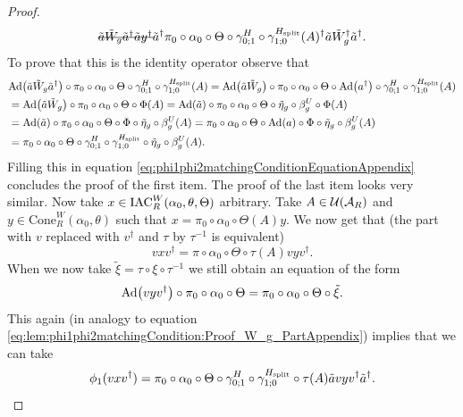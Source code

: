 \documentclass[11pt,a4paper,twoside]{article}
\numberwithin{equation}{section}
\begin{document}
\begin{proof}
\begin{align}
			\nonumber
			&\quad\stkout{\tilde{a}\tilde{W}_g\tilde{a}^\dagger\tilde{a}y^\dagger}\tilde{a}^\dagger\pi_0\circ\alpha_0\circ\Theta\circ\gamma^{H}_{0;1}\circ\gamma^{\Hsplit}_{1;0}(A)^\dagger\tilde{a}\tilde{W}_g^\dagger\tilde{a}^\dagger.
		\end{align}
		To prove that this is the identity operator observe that
		\begin{align}
			&\Ad{\tilde{a}\tilde{W}_g\tilde{a}^\dagger}\circ\pi_0\circ\alpha_0\circ\Theta\circ \gamma^{H}_{0;1}\circ\gamma^{\Hsplit}_{1;0}(A)=\Ad{\tilde{a}\tilde{W}_g}\circ\pi_0\circ\alpha_0\circ\Theta\circ\Ad{a^\dagger}\circ \gamma^{H}_{0;1}\circ\gamma^{\Hsplit}_{1;0}(A)\\
			&=\Ad{\tilde{a}\tilde{W}_g}\circ\pi_0\circ\alpha_0\circ\Theta\circ\Phi(A)=\Ad{\tilde{a}}\circ\pi_0\circ\alpha_0\circ\Theta\circ\tilde{\eta}_g\circ\beta_g^U\circ\Phi(A)\\
			&=\Ad{\tilde{a}}\circ\pi_0\circ\alpha_0\circ\Theta\circ\Phi\circ\tilde{\eta}_g\circ\beta_g^U(A)=\pi_0\circ\alpha_0\circ\Theta\circ\Ad{a}\circ\Phi\circ\tilde{\eta}_g\circ\beta_g^U(A)\\
			&=\pi_0\circ\alpha_0\circ\Theta\circ \gamma^{H}_{0;1}\circ\gamma^{\Hsplit}_{1;0} \circ\tilde{\eta}_g\circ\beta_g^U(A).
		\end{align}
		Filling this in equation \eqref{eq:phi1phi2matchingConditionEquationAppendix} concludes the proof of the first item. The proof of the last item looks very similar. Now take $x\in \textrm{IAC}_R^W(\alpha_0,\theta,\Theta)$ arbitrary. Take $A\in\mathcal U(\mathcal A_R)$ and $y\in\text{Cone}_R^W(\alpha_0,\theta)$ such that $x=\pi_0\circ\alpha_0\circ\Theta(A)y$. We now get that (the part with $v$ replaced with $v^\dagger$ and $\tau$ by $\tau^{-1}$ is equivalent)
		\begin{equation}
			vxv^\dagger=\pi\circ\alpha_0\circ\Theta\circ\tau(A)vyv^\dagger.
		\end{equation}
		When we now take $\tilde\xi=\tau\circ\xi\circ\tau^{-1}$ we still obtain an equation of the form
		\begin{equation}
			\Ad{vyv^\dagger}\circ \pi_0\circ\alpha_0\circ\Theta=\pi_0\circ\alpha_0\circ\Theta\circ\tilde\xi.
		\end{equation}
		This again (in analogy to equation \eqref{eq:lem:phi1phi2matchingCondition:Proof_W_g_PartAppendix}) implies that we can take
		\begin{equation}
			\phi_1(vxv^\dagger)=\pi_0\circ\alpha_0\circ\Theta\circ\gamma^{H}_{0;1}\circ\gamma^{\Hsplit}_{1;0}\circ\tau(A)\tilde{a}vyv^\dagger\tilde{a}^\dagger.

\end{equation}
\end{proof}
\end{document}
